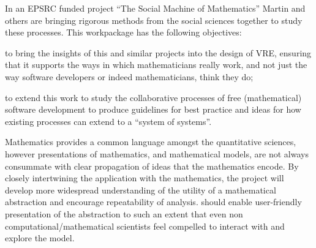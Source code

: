 \begin{workpackage}[id=social-aspects,wphases=0-48,
  title=Social Aspects,
  lead=UO,
  UORM=51,USHRM=8, USORM=6]
\begin{wpobjectives}
In an EPSRC funded project ``The Social Machine of Mathematics''
Martin and others are bringing rigorous methods from the social 
sciences together to study these processes. This workpackage has the following
objectives: 
\begin{compactitem}
\item to bring the insights of this and similar projects into the
  design of \TheProject VRE, ensuring that it supports the ways in
  which mathematicians really work, and not just the way software
  developers or indeed mathematicians, think they do;
\item to extend this work to study the collaborative processes of free
  (mathematical) software development to produce guidelines for best
  practice and ideas for how existing processes can extend to a
  ``system of systems''.
\item  {}
\end{compactitem} 





Mathematics provides a common language amongst the quantitative
sciences, however presentations of mathematics, and mathematical
models, are not always consummate with clear propagation of ideas that
the mathematics encode. By closely intertwining the application with
the mathematics, the project will develop more widespread
understanding of the utility of a mathematical abstraction and
encourage repeatability of analysis. \TheProject should enable
user-friendly presentation of the abstraction to such an extent that
even non computational/mathematical scientists feel compelled to
interact with and explore the model.


\end{wpobjectives}
\end{workpackage}
